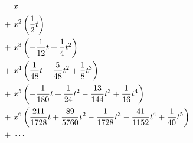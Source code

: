 \documentclass[10pt]{amsart}
\theoremstyle{plain} %
\theoremstyle{definition}
\theoremstyle{remark}
\begin{document}
\title{}
\author{Andrew Robbins}
\date{2006-MM-DD}
\begin{align}\notag  & x      \\
+\ & x^2    \left(\frac{1}{2}t\right) \notag\\
+\ & x^3    \left( -\frac{1}{12}t + \frac{1}{4}t^2\right) \notag\\
+\ & x^4    \left( \frac{1}{48}t - \frac{5}{48}t^2 + \frac{1}{8}t^3\right) \notag\\
+\ & x^5    \left( -\frac{1}{180}t + \frac{1}{24}t^2 - \frac{13}{144}t^3
+ \frac{1}{16}t^4 \right) \notag\\
+\ & x^6    \left( \frac{211}{1728}t + \frac{89}{5760}t^2 - 
\frac{1}{1728}t^3 - \frac{41}{1152}t^4 + \frac{1}{40}t^5\right) \notag\\
+\ & \cdots \notag \end{align}
\end{document}
